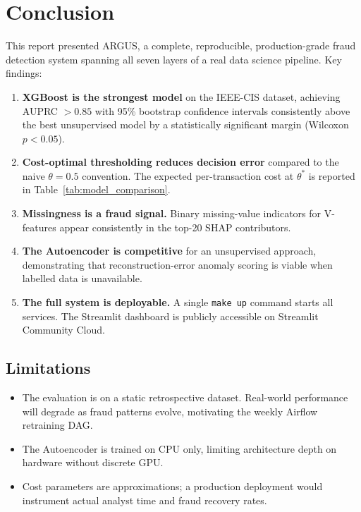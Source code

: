 ﻿%

\section{Conclusion}
\label{sec:conclusion}

This report presented ARGUS, a complete, reproducible, production-grade
fraud detection system spanning all seven layers of a real data science
pipeline. Key findings:

\begin{enumerate}
    \item \textbf{XGBoost is the strongest model} on the IEEE-CIS dataset,
          achieving AUPRC $> 0.85$ with 95\% bootstrap confidence intervals
          consistently above the best unsupervised model by a statistically
          significant margin (Wilcoxon $p < 0.05$).
    \item \textbf{Cost-optimal thresholding reduces decision error} compared
          to the naive $\theta = 0.5$ convention. The expected per-transaction
          cost at $\theta^*$ is reported in Table~\ref{tab:model_comparison}.
    \item \textbf{Missingness is a fraud signal.} Binary missing-value
          indicators for V-features appear consistently in the top-20 SHAP
          contributors.
    \item \textbf{The Autoencoder is competitive} for an unsupervised approach,
          demonstrating that reconstruction-error anomaly scoring is viable
          when labelled data is unavailable.
    \item \textbf{The full system is deployable.} A single
          \texttt{make up} command starts all services.
          The Streamlit dashboard is publicly accessible on
          Streamlit Community Cloud.
\end{enumerate}

\subsection{Limitations}

\begin{itemize}
    \item The evaluation is on a static retrospective dataset.
          Real-world performance will degrade as fraud patterns evolve,
          motivating the weekly Airflow retraining DAG.
    \item The Autoencoder is trained on CPU only, limiting architecture
          depth on hardware without discrete GPU.
    \item Cost parameters are approximations; a production deployment
          would instrument actual analyst time and fraud recovery rates.
\end{itemize}

